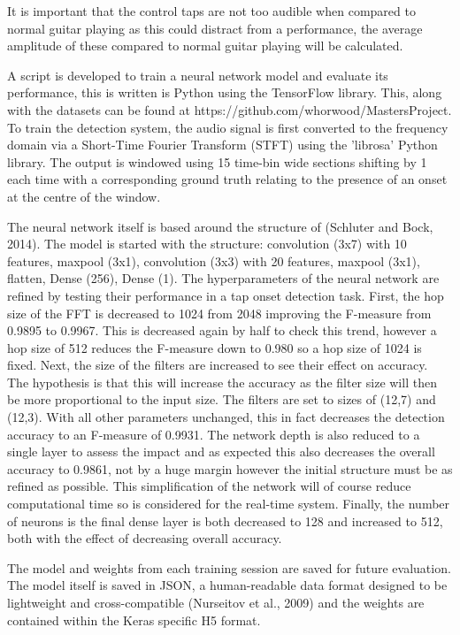 \documentclass[conference]{IEEEtran}
\begin{document}
It is important that the control taps are not too audible when compared to normal guitar playing as this could distract from a performance, the average amplitude of these compared to normal guitar playing will be calculated.

A script is developed to train a neural network model and evaluate its performance, this is written is Python using the TensorFlow library. This, along with the datasets can be found at https://github.com/whorwood/MastersProject. To train the detection system, the audio signal is first converted to the frequency domain via a Short-Time Fourier Transform (STFT) using the 'librosa' Python library. The output is windowed
using 15 time-bin wide sections shifting by 1 each time with a corresponding ground truth relating to the presence of an onset at the centre of the window.

The neural network itself is based around the structure of (Schluter and Bock, 2014). The model is started with the structure: convolution (3x7) with 10 features, maxpool (3x1), convolution (3x3) with 20 features, maxpool (3x1), flatten, Dense (256), Dense (1).
The hyperparameters of the neural network are refined by testing their performance in a tap onset detection task. First, the hop size of the FFT is decreased to 1024 from 2048 improving the F-measure from 0.9895 to 0.9967. This is decreased again by half to check this trend,
however a hop size of 512 reduces the F-measure down to 0.980 so a hop size of 1024 is fixed. Next, the size of the filters are increased to see their effect on accuracy. The hypothesis is that this will increase the accuracy as the filter size will then be
more proportional to the input size. The filters are set to sizes of (12,7) and (12,3). With all other parameters unchanged, this in fact decreases the detection accuracy to an F-measure of 0.9931. The network depth is also reduced to a single layer to assess the impact
and as expected this also decreases the overall accuracy to 0.9861, not by a huge margin however the initial structure must be as refined as possible. This simplification of the network will of course reduce computational time so is considered for the real-time system. 
Finally, the number of neurons is the final dense layer is both decreased to 128 and increased to 512, both with the effect of decreasing overall accuracy.

The model and weights from each training session are saved for future evaluation. The model itself is saved in JSON, a human-readable data format designed to be lightweight and cross-compatible (Nurseitov et al., 2009) and the weights are contained within the Keras specific H5 format. 
\end{document}
